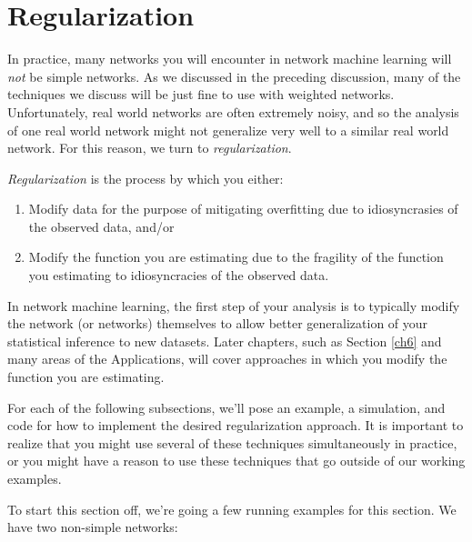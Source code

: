 \section{Regularization}
\label{sec:ch4:regularization}

In practice, many networks you will encounter in network machine learning will \emph{not} be simple networks. As we discussed in the preceding discussion, many of the techniques we discuss will be just fine to use with weighted networks. Unfortunately, real world networks are often extremely noisy, and so the analysis of one real world network might not generalize very well to a similar real world network. For this reason, we turn to \emph{regularization}. 

\textit{Regularization} is the process by which you either:
\begin{enumerate}
    \item Modify data for the purpose of mitigating overfitting due to idiosyncrasies of the observed data, and/or
    \item Modify the function you are estimating due to the fragility of the function you estimating to idiosyncracies of the observed data.
\end{enumerate}

In network machine learning, the first step of your analysis is to typically modify the network (or networks) themselves to allow better generalization of your statistical inference to new datasets. Later chapters, such as Section \ref{ch6} and many areas of the Applications, will cover approaches in which you modify the function you are estimating.

For each of the following subsections, we'll pose an example, a simulation, and code for how to implement the desired regularization approach. It is important to realize that you might use several of these techniques simultaneously in practice, or you might have a reason to use these techniques that go outside of our working examples.

To start this section off, we're going a few running examples for this section. We have two non-simple networks:

